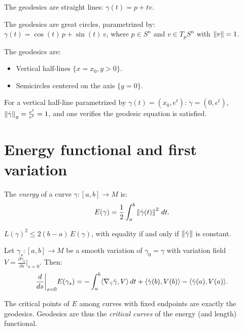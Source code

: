 \begin{example}[Geodesics of $\R^n$]
The geodesics are straight lines: $\gamma(t) = p + tv$.
\end{example}

\begin{example}[Geodesics of $S^n$]
The geodesics are great circles, parametrized by:
$\gamma(t) = \cos(t)\, p + \sin(t)\, v$,
where $p \in S^n$ and $v \in T_pS^n$ with $\left\| v \right\| = 1$.
\end{example}

\begin{example}
The geodesics are:
\begin{itemize}
    \item Vertical half-lines $\{x = x_0, y > 0\}$.
    \item Semicircles centered on the axis $\{y = 0\}$.
\end{itemize}
For a vertical half-line parametrized by $\gamma(t) = (x_0, e^t)$:
$\dot\gamma = (0, e^t)$, $\left\| \dot\gamma \right\|_g = \frac{e^t}{e^t} = 1$, and one
verifies the geodesic equation is satisfied.
\end{example}

\section{Energy functional and first variation}

\begin{definition}
The \emph{energy} of a curve $\gamma : [a,b] \to M$ is:
\[
    E(\gamma) = \frac{1}{2}\int_a^b \left\| \dot\gamma(t) \right\|^2\, dt.
\]
\end{definition}

\begin{proposition}
$L(\gamma)^2 \leq 2(b-a)\, E(\gamma)$, with equality if and only if
$\left\| \dot\gamma \right\|$ is constant.
\end{proposition}

\begin{theorem}
Let $\gamma_s : [a,b] \to M$ be a smooth variation of $\gamma_0 = \gamma$ with
variation field $V = \frac{\partial\gamma_s}{\partial s}\big|_{s=0}$. Then:
\[
    \frac{d}{ds}\bigg|_{s=0} E(\gamma_s) = -\int_a^b \langle \nabla_{\dot\gamma}\dot\gamma, V \rangle\, dt
    + \langle \dot\gamma(b), V(b) \rangle - \langle \dot\gamma(a), V(a) \rangle.
\]
\end{theorem}

\begin{corollary}
The critical points of $E$ among curves with fixed endpoints are exactly the
geodesics. Geodesics are thus the \emph{critical curves} of the energy (and length)
functional.
\end{corollary}

